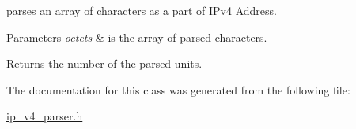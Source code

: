 parses an array of characters as a part of I\-Pv4 Address. 


\begin{DoxyParams}{Parameters}
{\em octets} & is the array of parsed characters. \\
\hline
\end{DoxyParams}
\begin{DoxyReturn}{Returns}
the number of the parsed units. 
\end{DoxyReturn}


The documentation for this class was generated from the following file\-:\begin{DoxyCompactItemize}
\item 
\hyperlink{ip__v4__parser_8h}{ip\-\_\-v4\-\_\-parser.\-h}\end{DoxyCompactItemize}
